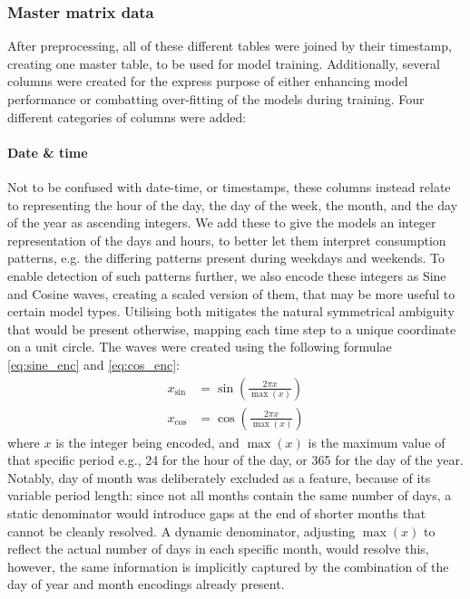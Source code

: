 \subsubsection{Master matrix data}
After preprocessing, all of these
different tables were joined by their timestamp, creating one
master table, to be used for model training. Additionally,
several columns were created for the express purpose of either
enhancing model performance or combatting over-fitting of the
models during training. Four different categories of columns
were added:
\paragraph{Date \& time}
Not to be confused with date-time, or
timestamps, these columns instead relate to representing the
hour of the day, the day of the week, the month, and the day of
the year as ascending integers. We add these to give the models
an integer representation of the days and hours, to better let
them interpret consumption patterns, e.g. the differing patterns
present during weekdays and weekends. To enable detection of
such patterns further, we also encode these integers as Sine and
Cosine waves, creating a scaled version of them, that may be
more useful to certain model types. Utilising both 
mitigates the
natural symmetrical ambiguity that would be present otherwise,
mapping each time step to a unique coordinate on a unit circle.
The waves were created using the following formulae \ref{eq:sine_enc} 
and \ref{eq:cos_enc}:
\begin{align}
	x_{\text{sin}} &= \sin\left(\frac{2\pi x}{\max(x)}\right) 
	\label{eq:sine_enc} \\
	x_{\text{cos}} &= \cos\left(\frac{2\pi x}{\max(x)}\right) \label{eq:cos_enc}
\end{align}
where $x$ is the integer being encoded, and $\max(x)$ is the maximum value of 
that specific period e.g., 24 for the hour of the day, or 365 for the day of 
the year. Notably, day of month was deliberately excluded as a feature, 
because of its variable period length: since not all months contain the same 
number of days, a static denominator would introduce gaps at the end of shorter 
months that cannot be cleanly resolved. A dynamic denominator, adjusting 
$\max(x)$ to reflect the actual number of days in each specific month, would 
resolve this, however, the same information is implicitly captured by the 
combination of the day of year and month encodings already present.


